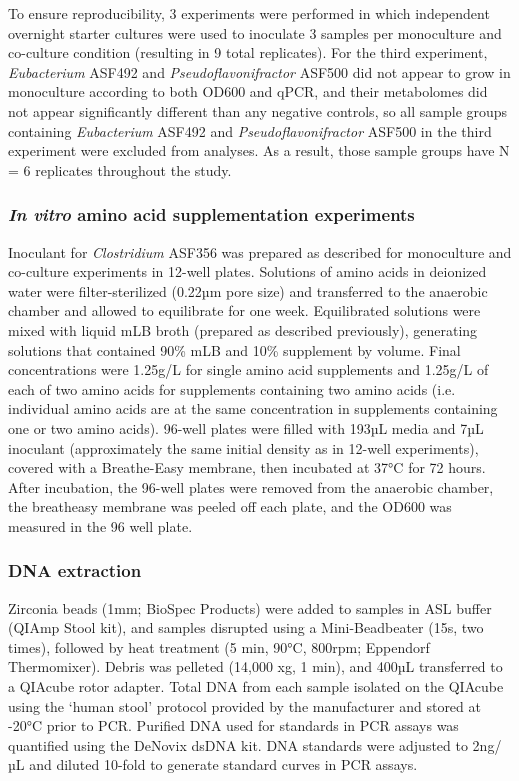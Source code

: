 \documentclass[11pt,twocolumn,notitlepage,openany,twoside]{book}
\begin{document}
\begin{refsection}
To ensure reproducibility, 3 experiments were performed in which independent overnight starter cultures were used to inoculate 3 samples per monoculture and co-culture condition (resulting in 9 total replicates). For the third experiment, \textit{Eubacterium} ASF492 and \textit{Pseudoflavonifractor} ASF500 did not appear to grow in monoculture according to both OD600 and qPCR, and their metabolomes did not appear significantly different than any negative controls, so all sample groups containing \textit{Eubacterium} ASF492 and \textit{Pseudoflavonifractor} ASF500 in the third experiment were excluded from analyses. As a result, those sample groups have N = 6 replicates throughout the study.

\subsubsection{\textit{In vitro} amino acid supplementation experiments}

Inoculant for \textit{Clostridium} ASF356 was prepared as described for monoculture and co-culture experiments in 12-well plates. Solutions of amino acids in deionized water were filter-sterilized (0.22µm pore size) and transferred to the anaerobic chamber and allowed to equilibrate for one week. Equilibrated solutions were mixed with liquid mLB broth (prepared as described previously), generating solutions that contained 90\% mLB and 10\% supplement by volume. Final concentrations were 1.25g/L for single amino acid supplements and 1.25g/L of each of two amino acids for supplements containing two amino acids (i.e. individual amino acids are at the same concentration in supplements containing one or two amino acids). 96-well plates were filled with 193µL media and 7µL inoculant (approximately the same initial density as in 12-well experiments), covered with a Breathe-Easy membrane, then incubated at 37°C for 72 hours. After incubation, the 96-well plates were removed from the anaerobic chamber, the breatheasy membrane was peeled off each plate, and the OD600 was measured in the 96 well plate.

\subsubsection{DNA extraction}

Zirconia beads (1mm; BioSpec Products) were added to samples in ASL buffer (QIAmp Stool kit), and samples disrupted using a Mini-Beadbeater (15s, two times), followed by heat treatment (5 min, 90°C, 800rpm; Eppendorf Thermomixer). Debris was pelleted (14,000 xg, 1 min), and 400µL transferred to a QIAcube rotor adapter. Total DNA from each sample isolated on the QIAcube using the ‘human stool’ protocol provided by the manufacturer and stored at -20°C prior to PCR. Purified DNA used for standards in PCR assays was quantified using the DeNovix dsDNA kit. DNA standards were adjusted to 2ng/µL and diluted 10-fold to generate standard curves in PCR assays.


\end{refsection}
\end{document}
